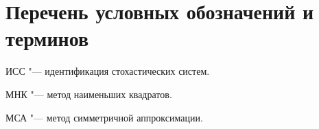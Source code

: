 \chapter*{Перечень условных обозначений и терминов}

ИСС "--- идентификация стохастических систем.

МНК "--- метод наименьших квадратов.

МСА "--- метод симметричной аппроксимации.


